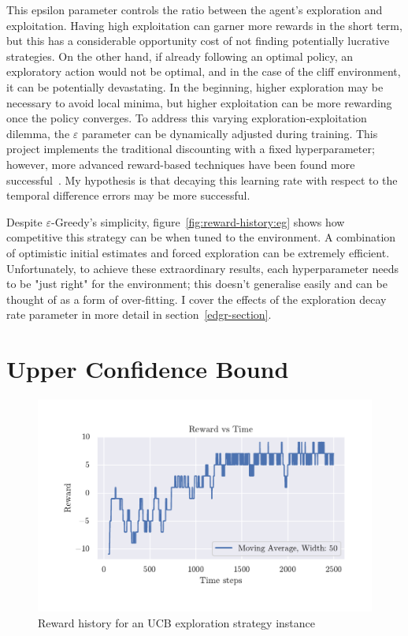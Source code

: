 \documentclass[]{final_report}
\begin{document}
This epsilon parameter controls the ratio between the agent's exploration and exploitation. Having high exploitation can garner more rewards in the short term, but this has a considerable opportunity cost of not finding potentially lucrative strategies. On the other hand, if already following an optimal policy, an exploratory action would not be optimal, and in the case of the cliff environment, it can be potentially devastating. In the beginning, higher exploration may be necessary to avoid local minima, but higher exploitation can be more rewarding once the policy converges. To address this varying exploration-exploitation dilemma, the $\varepsilon$ parameter can be dynamically adjusted during training. This project implements the traditional discounting with a fixed hyperparameter; however, more advanced reward-based techniques have been found more successful~\cite{rewardEpsilonDecay}. My hypothesis is that decaying this learning rate with respect to the temporal difference errors may be more successful. 

Despite $\varepsilon$-Greedy's simplicity, figure~\ref{fig:reward-history:eg} shows how competitive this strategy can be when tuned to the environment. A combination of optimistic initial estimates and forced exploration can be extremely efficient. Unfortunately, to achieve these extraordinary results, each hyperparameter needs to be "just right" for the environment; this doesn't generalise easily and can be thought of as a form of over-fitting. I cover the effects of the exploration decay rate parameter in more detail in section~\ref{edgr-section}.


\section{Upper Confidence Bound}

\begin{figure}[H]
  \centering
  
  \includegraphics[trim={0 1cm 0 1cm},clip,width=\textwidth]{reward-history/UCB.pdf}
  
  \caption{\label{fig:reward-history:ucb} Reward history for an UCB exploration strategy instance}
\end{figure}
\end{document}

